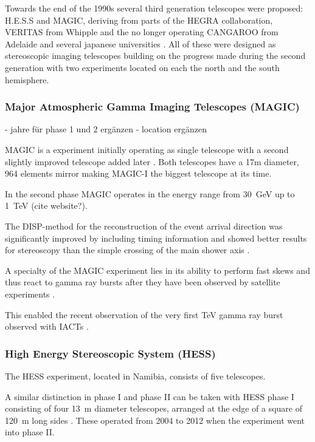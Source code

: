Towards the end of the 1990s several third generation telescopes were
proposed:
H.E.S.S and MAGIC, deriving from parts of the HEGRA collaboration, 
VERITAS from Whipple and the no longer operating CANGAROO from Adelaide and 
several japanese universities \cite{HILLAS201319}.
All of these were designed as stereoscopic imaging telescopes building on the progress made during the 
second generation with two experiments located on each the north and the south hemisphere.

\subsubsection{Major Atmospheric Gamma Imaging Telescopes (MAGIC)}
- jahre für phase 1 und 2 ergänzen
- location ergänzen

MAGIC is a experiment initially operating as single telescope with a second slightly improved 
telescope added later \cite{BAIXERAS2003247}.
Both telescopes have a 17m diameter, 964 elements mirror making MAGIC-I the biggest 
telescope at its time.

In the second phase MAGIC operates in the energy range from \SI{30}{\giga\eV}
up to \SI{1}{\TeV} (cite website?).

The DISP-method for the reconstruction of the event arrival direction 
was significantly improved by including timing information and showed better 
results for stereoscopy than the simple crossing of the main shower axis \cite{ALEKSIC2012345}.

A specialty of the MAGIC experiment lies in its ability to 
perform fast skews and thus react to gamma ray bursts after they have been observed 
by satellite experiments \cite{2003ICRC....5.2943B}.

This enabled the recent observation of the very first \si{\TeV}
gamma ray burst observed with IACTs \cite{collaboration2019teraelectronvolt}.


\subsubsection{High Energy Stereoscopic System (HESS)}

The HESS experiment, located in Namibia,  consists of five telescopes.

A similar distinction in phase I and phase II can be taken with 
HESS phase I consisting of four \SI{13}{\meter} diameter telescopes,
arranged at the edge of a square of \SI{120}{\meter} long sides \cite{HINTON2004331}.
These operated from 2004 to 2012 when the experiment went into phase II.

